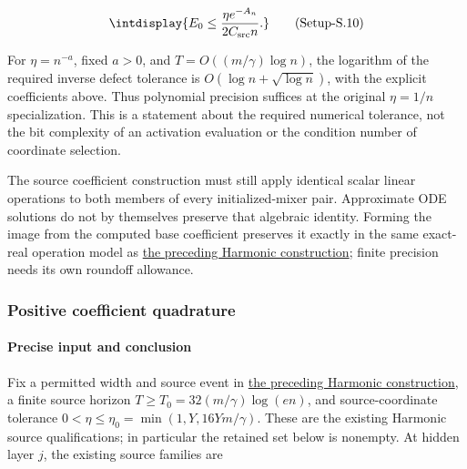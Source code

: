 \label{int:eq-setup-s-10}
\begingroup\renewcommand{\theHequation}{intdisplay.867}
\begin{equation}
\intdisplay{
E_0\le \frac{\eta e^{-A_n}}{2C_{\rm src}n}.
}
\tag{Setup-S.10}
\label{int:eq-0421-setup-s-10}
\end{equation}
\endgroup


For \(\eta=n^{-a}\), fixed \(a>0\), and \(T=O((m/\gamma)\log n)\), the logarithm of the required inverse defect tolerance is \(O(\log n+\sqrt{\log n})\), with the explicit coefficients above. Thus polynomial precision suffices at the original \(\eta=1/n\) specialization. This is a statement about the required numerical tolerance, not the bit complexity of an activation evaluation or the condition number of coordinate selection.



The source coefficient construction must still apply identical scalar linear operations to both members of every initialized-mixer pair. Approximate ODE solutions do not by themselves preserve that algebraic identity. Forming the image from the computed base coefficient preserves it exactly in the same exact-real operation model as \hyperref[int:harmonic-construction]{the preceding Harmonic construction}; finite precision needs its own roundoff allowance.


\subsubsection{Positive coefficient quadrature}
\label{int:setup-quadrature}

\paragraph{Precise input and conclusion}
\label{int:setup-quadrature-1}
\mbox{}\par\smallskip


Fix a permitted width and source event in \hyperref[int:harmonic-construction]{the preceding Harmonic construction}, a finite source horizon \(T\ge T_0=32(m/\gamma)\log(en)\), and source-coordinate tolerance \(0<\eta\le\eta_0=\min(1,\allowbreak Y,\allowbreak 16Ym/\gamma)\). These are the existing Harmonic source qualifications; in particular the retained set below is nonempty. At hidden layer \(j\), the existing source families are


